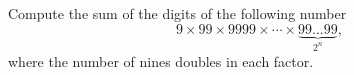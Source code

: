 Compute the sum of the digits of the following number
$$9 \times 99 \times 9999 \times \cdots \times \underbrace{99\ldots 99}_{2^n},$$
where the number of nines doubles in each factor.